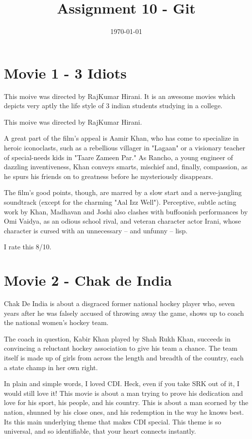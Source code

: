 \documentclass[]{article}
\title{Assignment 10 - Git}
\date{\today}
\begin{document}
\maketitle
\section{Movie 1 - 3 Idiots}
This moive was directed by RajKumar Hirani. It is an awesome movies which depicts very aptly the life style of 3 indian students studying in a college.

This moive was directed by RajKumar Hirani.

A great part of the film's appeal is Aamir Khan, who has come to specialize in heroic iconoclasts, such as a rebellious villager in "Lagaan" or a visionary teacher of special-needs kids in "Taare Zameen Par." As Rancho, a young engineer of dazzling inventiveness, Khan conveys smarts, mischief and, finally, compassion, as he spurs his friends on to greatness before he mysteriously disappears.

The film's good points, though, are marred by a slow start and a nerve-jangling soundtrack (except for the charming "Aal Izz Well"). Perceptive, subtle acting work by Khan, Madhavan and Joshi also clashes with buffoonish performances by Omi Vaidya, as an odious school rival, and veteran character actor Irani, whose character is cursed with an unnecessary -- and unfunny -- lisp.

I rate this 8/10.


\section{Movie 2 - Chak de India}
Chak De India is about a disgraced former national hockey player who, seven years after he was falsely accused of throwing away the game, shows up to coach the national women’s hockey team.

The coach in question, Kabir Khan played by Shah Rukh Khan, succeeds in convincing a reluctant hockey association to give his team a chance. The team itself is made up of girls from across the length and breadth of the country, each a state champ in her own right. 

In plain and simple words, I loved CDI. Heck, even if you take SRK out of it, I would still love it! This movie is about a man trying to prove his dedication and love for his sport, his people, and his country. This is about a man scorned by the nation, shunned by his close ones, and his redemption in the way he knows best. Its this main underlying theme that makes CDI special. This theme is so universal, and so identifiable, that your heart connects instantly.
\end{document}
